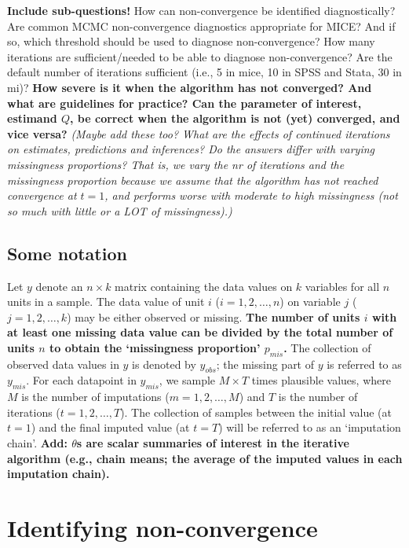 \documentclass[Royal,times,sageh]{sagej}
\begin{document}
\textbf{Include sub-questions!} How can non-convergence be identified
diagnostically? Are common MCMC non-convergence diagnostics appropriate
for MICE? And if so, which threshold should be used to diagnose
non-convergence? How many iterations are sufficient/needed to be able to
diagnose non-convergence? Are the default number of iterations
sufficient (i.e., 5 in mice, 10 in SPSS and Stata, 30 in mi)?
\textbf{How severe is it when the algorithm has not converged? And what
are guidelines for practice? Can the parameter of interest, estimand
\(Q\), be correct when the algorithm is not (yet) converged, and vice
versa?} \emph{(Maybe add these too? What are the effects of continued
iterations on estimates, predictions and inferences? Do the answers
differ with varying missingness proportions? That is, we vary the nr of
iterations and the missingness proportion because we assume that the
algorithm has not reached convergence at \(t=1\), and performs worse
with moderate to high missingness (not so much with little or a LOT of
missingness).)}

\hypertarget{some-notation}{%
\subsection{Some notation}\label{some-notation}}

Let \(y\) denote an \(n \times k\) matrix containing the data values on
\(k\) variables for all \(n\) units in a sample. The data value of unit
\(i\) (\(i = 1, 2, \dots, n\)) on variable \(j\)
(\(j = 1, 2, \dots, k\)) may be either observed or missing. \textbf{The
number of units \(i\) with at least one missing data value can be
divided by the total number of units \(n\) to obtain the `missingness
proportion' \(p_{mis}\).} The collection of observed data values in
\(y\) is denoted by \(y_{obs}\); the missing part of \(y\) is referred
to as \(y_{mis}\). For each datapoint in \(y_{mis}\), we sample
\(M \times T\) times plausible values, where \(M\) is the number of
imputations (\(m = 1, 2, \dots, M\)) and \(T\) is the number of
iterations (\(t = 1, 2, \dots, T\)). The collection of samples between
the initial value (at \(t=1\)) and the final imputed value (at \(t=T\))
will be referred to as an `imputation chain'. \textbf{Add: \(\theta\)s
are scalar summaries of interest in the iterative algorithm (e.g., chain
means; the average of the imputed values in each imputation chain). }

\hypertarget{identifying-non-convergence}{%
\section{Identifying
non-convergence}\label{identifying-non-convergence}}
\end{document}
